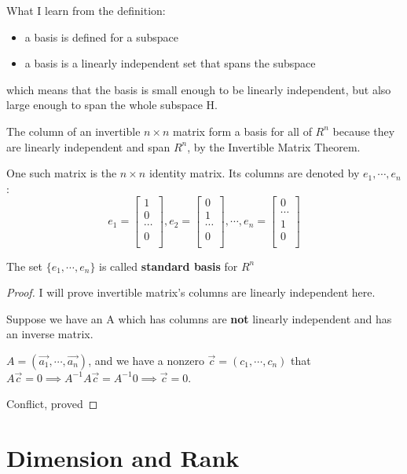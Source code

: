 \begin{remark}
    What I learn from the definition:
    \begin{itemize}
        \item a basis is defined for a subspace
        \item a basis is a linearly independent set that spans the subspace
    \end{itemize}
    which means that the basis is small enough to be linearly independent, but also large enough to span the whole subspace H.
\end{remark}

\begin{eg}
    The column of an invertible \(n \times n\) matrix form a basis for all of \(R^n\) because they are linearly independent and span \(R^n\), by the Invertible Matrix Theorem.  

    One such matrix is the \(n \times n\) identity matrix. Its columns are denoted by \(e_1, \cdots, e_n\):
    \[
        e_1 = \begin{bmatrix}
             1 \\
             0 \\
             \cdots \\
             0 \\
        \end{bmatrix},
        e_2 = \begin{bmatrix}
             0 \\
             1 \\
             \cdots \\
             0 \\
        \end{bmatrix},
        \cdots,
        e_n = \begin{bmatrix}
             0 \\
             \cdots \\
             1 \\
             0 \\
        \end{bmatrix}
    \]  

    The set \(\{e_1, \cdots, e_n\}\)  is called \textbf{standard basis} for \(R^n\)  
\end{eg}

\begin{proof}
    I will prove invertible matrix's columns are linearly independent here.

    Suppose we have an A which has columns are \textbf{not} linearly independent and has an inverse matrix.

    \(A = (\vec{a_1} , \cdots, \vec{a_n} )\), and we have a nonzero \(\vec{c} = (c_1, \cdots, c_n)\) that \(A \vec{c} = 0 \implies A^{-1}A \vec{c}  = A^{-1} 0 \implies \vec{c}  = 0\).  

    Conflict, proved
\end{proof}

\section{Dimension and Rank}
